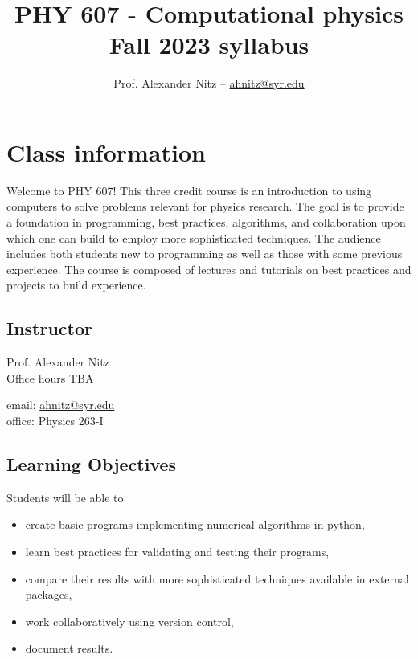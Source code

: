 \documentclass[12pt]{article}
\title{PHY 607 - Computational physics \\ Fall 2023 syllabus}
\author{Prof. Alexander Nitz -- \href{mailto:ahnitz@syr.edu}{ahnitz@syr.edu}}
\date{}
\begin{document}
\maketitle

\section*{Class information}

Welcome to PHY 607! This three credit course is an introduction to using computers to solve problems relevant for physics research. The goal is to provide a foundation in programming, best practices, algorithms, and collaboration upon which one can build to employ more sophisticated techniques. The audience includes both students new to programming as well as those with some previous experience. The course is composed of
lectures and tutorials on best practices and projects to build experience.

\subsection*{Instructor}

\begin{minipage}{0.5\textwidth}
  Prof. Alexander Nitz \\
  Office hours TBA
\end{minipage}
\begin{minipage}{0.5\textwidth}
  \begin{flushright}
  email: \href{mailto:ahnitz@syr.edu}{ahnitz@syr.edu} \\
  office: Physics 263-I
  \end{flushright}
\end{minipage}

\subsection*{Learning Objectives}
Students will be able to
\begin{itemize}
\item create basic programs implementing numerical algorithms in python,
\item learn best practices for validating and testing their programs,
\item compare their results with more sophisticated techniques available in external packages,
\item work collaboratively using version control,
\item document results.
\end{itemize}
\end{document}
